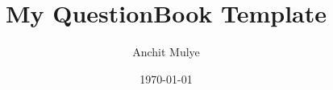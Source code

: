 \newpage
\thispagestyle{empty} %
\title{My QuestionBook Template}
\author{Anchit Mulye}
\date{\today}
\maketitle

\tableofcontents
\newpage